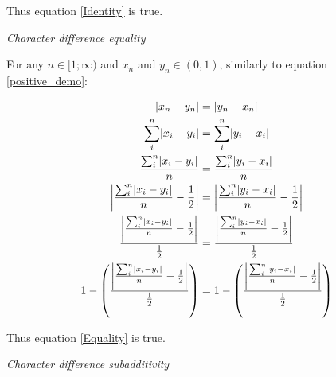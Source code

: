 \documentclass[12pt,letterpaper]{article}
\DeclarePairedDelimiter\abs{\lvert}{\rvert}%
\renewcommand{\subsection}[1]{%
\bigskip
\begin{center}
\begin{large}
\normalfont\itshape #1
\end{large}
\end{center}}
\begin{document}
Thus equation \ref{Identity} is true.

\subsection{Character difference equality}

For any $n \in [1;\infty)$ and $x_{n}$ and $y_{n} \in (0,1)$, similarly to equation \ref{positive_demo}:

\begin{equation}
    \label{equality_demo}
    \begin{aligned}
    \abs{x_{n}-y_{n}} &= \abs{y_{n}-x_{n}}\\
    \sum_{i}^{n}\abs{x_{i}-y_{i}} &= \sum_{i}^{n}\abs{y_{i}-x_{i}}\\
    \frac{\sum_{i}^{n}\abs{x_{i}-y_{i}}}{n} &= \frac{\sum_{i}^{n}\abs{y_{i}-x_{i}}}{n}\\
    \abs*{\frac{\sum_{i}^{n}\abs{x_{i}-y_{i}}}{n}-\frac{1}{2}} &= \abs*{\frac{\sum_{i}^{n}\abs{y_{i}-x_{i}}}{n}-\frac{1}{2}}\\
    \frac{\abs*{\frac{\sum_{i}^{n}\abs{x_{i}-y_{i}}}{n}-\frac{1}{2}}}{\frac{1}{2}} &= \frac{\abs*{\frac{\sum_{i}^{n}\abs{y_{i}-x_{i}}}{n}-\frac{1}{2}}}{\frac{1}{2}}\\
    1 - \left(\frac{\abs*{\frac{\sum_{i}^{n}\abs{x_{i}-y_{i}}}{n}-\frac{1}{2}}}{\frac{1}{2}}\right) &= 1 - \left(\frac{\abs*{\frac{\sum_{i}^{n}\abs{y_{i}-x_{i}}}{n}-\frac{1}{2}}}{\frac{1}{2}}\right)\\
    \end{aligned}
\end{equation}

Thus equation \ref{Equality} is true.

\subsection{Character difference subadditivity}


\end{document}
